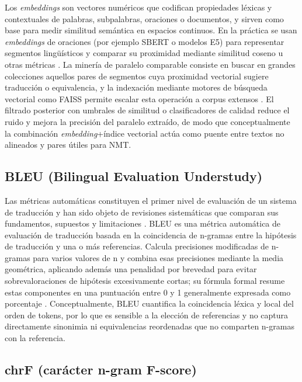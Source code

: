 \documentclass[12pt,a4paper,oneside]{book}
\begin{document}
Los \emph{embeddings} son vectores numéricos que codifican propiedades léxicas y contextuales de palabras, subpalabras, oraciones o documentos, y sirven como base para medir similitud semántica en espacios continuos. En la práctica se usan \emph{embeddings} de oraciones (por ejemplo SBERT o modelos E5) para representar segmentos lingüísticos y comparar su proximidad mediante similitud coseno u otras métricas \parencite{reimers2019sbert,wang2022e5}. La minería de paralelo comparable consiste en buscar en grandes colecciones aquellos pares de segmentos cuya proximidad vectorial sugiere traducción o equivalencia, y la indexación mediante motores de búsqueda vectorial como FAISS permite escalar esta operación a corpus extensos \parencite{artetxe2019,johnson2019faiss}. El filtrado posterior con umbrales de similitud o clasificadores de calidad reduce el ruido y mejora la precisión del paralelo extraído, de modo que conceptualmente la combinación \emph{embedding}+índice vectorial actúa como puente entre textos no alineados y pares útiles para NMT.

\subsection{BLEU (Bilingual Evaluation Understudy)}\label{bleu-bilingual-evaluation-understudy}

Las métricas automáticas constituyen el primer nivel de evaluación de un sistema de traducción y han sido objeto de revisiones sistemáticas que comparan sus fundamentos, supuestos y limitaciones \parencite{lee2023survey}. BLEU es una métrica automática de evaluación de traducción basada en la coincidencia de n-gramas entre la hipótesis de traducción y una o más referencias. Calcula precisiones modificadas de n-gramas para varios valores de n y combina esas precisiones mediante la media geométrica, aplicando además una penalidad por brevedad para evitar sobrevaloraciones de hipótesis excesivamente cortas; su fórmula formal resume estas componentes en una puntuación entre 0 y 1 generalmente expresada como porcentaje \parencite{papineni2002bleu}. Conceptualmente, BLEU cuantifica la coincidencia léxica y local del orden de tokens, por lo que es sensible a la elección de referencias y no captura directamente sinonimia ni equivalencias reordenadas que no comparten n-gramas con la referencia.

\subsection{chrF (carácter n-gram F-score)}\label{chrf-caruxe1cter-n-gram-f-score}
\end{document}
